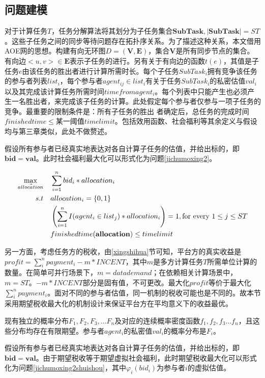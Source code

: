 \documentclass[promaster]{thesis-uestc}
\begin{document}
\subsection{问题建模}

对于计算任务$T$，任务分解算法将其划分为子任务集合$\mathbf{SubTask},|\mathbf{SubTask}| = ST$。这些子任务之间的同步等待问题存在拓扑序关系。为了描述这种关系，本文借用AOE网的思想。构建有向无环图$D=(\mathbf{V},\mathbf{E})$，集合$\mathbf{V}$是所有同步节点的集合。有向边$<u,v> \in \mathbf{E}$表示子任务的进行。另有关于有向边的函数$t(e)$，其值是子任务$e$由该任务的胜出者进行计算所需时长。每个子任务$SubTask_i$拥有竞争该任务的参与者列表$list_i$，每个参与者$agent_{ij} \in list_i$有关于任务$SubTask_i$的私密估值$val_i$以及其完成该计算任务所需时间$timefromagent_i$。每个列表中只能产生也必须产生一名胜出者，来完成该子任务的计算。此处假定每个参与者仅参与一项子任务的竞争。最重要的限制条件是：所有子任务的胜出
者确定后，总任务的完成时间$finishedtime \leq $某一阈值$timelimit$。包括效用函数、社会福利等其余定义与假设均与第三章类似，此处不做赘述。

假设所有参与者已经真实地表达对各自计算子任务的估值，并给出标的，即$\mathbf{bid}=\mathbf{val}$。此时社会福利最大化可以形式化为问题\ref{jichumoxing2}。

\begin{align}
    \label{jichumoxing2}
    \max_{\vec{allocation}} \quad&\sum_{i=1}^{n}{bid_i*allocation_i}\\
    s.t                     \quad&allocation_i = \{0,1\}\notag\\
    \quad&\left(\sum_{i=1}^{n}{I(agent_i \in list_j)*allocation_i}\right) = 1,\text{for every }1 \leq j \leq ST\notag\\
    \quad&finishedtime(\mathbf{allocation}) \leq timelimit
    \notag
\end{align}


另一方面，考虑任务方的税收，由\ref{xingshihua}节可知，平台方的真实收益是$profit = \sum_{i}^{n}{payment_i}-m*INCENT$，其中$m$是多方计算任务$T$所需单位计算的数量。在简单可并行场景下，$m=datademand$；在依赖相关计算场景中，$m=ST$。$-m*INCENT$部分是固有值，不可更改。最大化$profit$等价于最大化$\sum_{i}^{n}{payment_i}$。面对不同的参与者估值，同一机制的税收可能也是不同的。故本节采用期望税收最大化的机制设计来保证平台方在平均意义下的收益最优。

现有独立的概率分布$F_1,F_2,F_3,...F_n$及对应的连续概率密度函数$f_1,f_2,f_3...f_n$，且这些分布均存在有限期望。参与者$agent_i$的私密值$val_i$的概率分布是$F_i$。

假设所有参与者已经真实地表达对各自计算子任务的估值，并给出标的，即$\mathbf{bid}=\mathbf{val}$。由于期望税收等于期望虚拟社会福利，此时期望税收最大化可以形式化为问题\ref{jichumoxing2shuishou}，其中$\varphi _i(bid_i)$为参与者$i$的虚拟估值。
\end{document}
